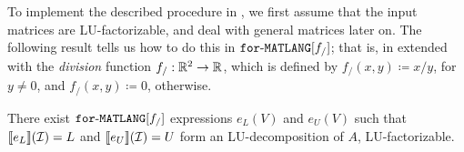 To implement the described procedure in \langfor, we first assume that the input matrices are LU-factorizable, and  deal with general matrices later on. The following result tells us how to do this in $\texttt{for}\text{-}\texttt{MATLANG}[f_/]$; that is, in \langfor extended with the \textit{division} function  $f_/:\mathbb{R}^2\to\mathbb{R}$, which is defined by $f_/(x,y)\coloneqq x/y$, for $y\neq 0$, and $f_/(x,y)\coloneqq   0$, otherwise. %

\begin{proposition}\label{prop:gauss}
There exist $\texttt{for}\text{-}\texttt{MATLANG}[f_/]$ expressions $e_L(V)$ and $e_U(V)$ such that
$\llbracket e_L \rrbracket(\mathcal{I})=L$ and $\llbracket e_U \rrbracket(\mathcal{I})=U$ form an LU-decomposition of $A$,
 LU-factorizable.
\end{proposition}
